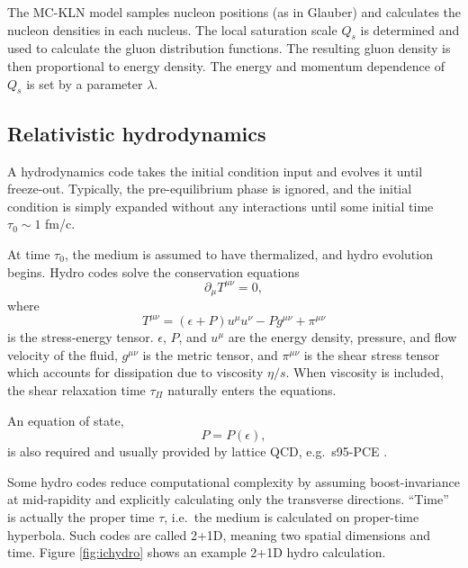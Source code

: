 \documentclass[reprint,amsmath]{revtex4-1}
\begin{document}
The MC-KLN model \cite{kln} samples nucleon positions (as in Glauber) and calculates the nucleon densities in each nucleus.  The local
saturation scale $Q_s$ is determined and used to calculate the gluon distribution functions.  The resulting gluon density is then
proportional to energy density.  The energy and momentum dependence of $Q_s$ is set by a parameter $\lambda$.



\subsection{Relativistic hydrodynamics}

A hydrodynamics code takes the initial condition input and evolves it until freeze-out.  Typically, the pre-equilibrium phase is ignored,
and the initial condition is simply expanded without any interactions until some initial time $\tau_0 \sim 1$ fm/c.

At time $\tau_0$, the medium is assumed to have thermalized, and hydro evolution begins.  Hydro codes solve the conservation equations
\begin{equation}
  \partial_\mu T^{\mu\nu} = 0,
\end{equation}
where
\begin{equation}
  T^{\mu\nu} = (\epsilon + P) u^\mu u^\nu - P g^{\mu\nu} + \pi^{\mu\nu}
\end{equation}
is the stress-energy tensor.  $\epsilon$, $P$, and $u^\mu$ are the energy density, pressure, and flow velocity of the fluid, $g^{\mu\nu}$ is
the metric tensor, and $\pi^{\mu\nu}$ is the shear stress tensor which accounts for dissipation due to viscosity $\eta/s$.  When viscosity
is included, the shear relaxation time $\tau_\Pi$ naturally enters the equations.

An equation of state,
\begin{equation}
  P = P(\epsilon),
\end{equation}
is also required and usually provided by lattice QCD, e.g.\ s95-PCE \cite{eos}.

Some hydro codes reduce computational complexity by  assuming boost-invariance at mid-rapidity and explicitly calculating only the
transverse directions.  ``Time'' is actually the proper time $\tau$, i.e.\ the medium is calculated on proper-time hyperbola.  Such codes
are called 2+1D, meaning two spatial dimensions and time.  Figure \ref{fig:ichydro} shows an example 2+1D hydro calculation.
\end{document}
